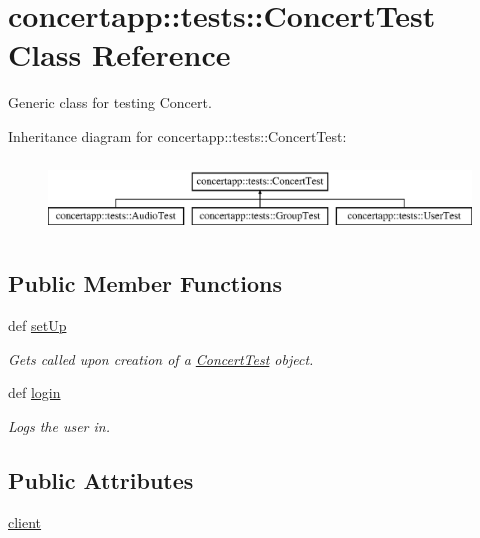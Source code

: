 \hypertarget{classconcertapp_1_1tests_1_1_concert_test}{
\section{concertapp::tests::ConcertTest Class Reference}
\label{classconcertapp_1_1tests_1_1_concert_test}
}


Generic class for testing Concert.  


Inheritance diagram for concertapp::tests::ConcertTest:\begin{figure}[H]
\begin{center}
\leavevmode
\includegraphics[height=1.975309cm]{classconcertapp_1_1tests_1_1_concert_test}
\end{center}
\end{figure}
\subsection*{Public Member Functions}
\begin{DoxyCompactItemize}
\item 
def \hyperlink{classconcertapp_1_1tests_1_1_concert_test_ab670c5bba4a3963036682d228f142406}{setUp}
\begin{DoxyCompactList}\small\item\em Gets called upon creation of a \hyperlink{classconcertapp_1_1tests_1_1_concert_test}{ConcertTest} object. \item\end{DoxyCompactList}\item 
def \hyperlink{classconcertapp_1_1tests_1_1_concert_test_a089e883fda6f7bd52b05b2ec3c1d691e}{login}
\begin{DoxyCompactList}\small\item\em Logs the user in. \item\end{DoxyCompactList}\end{DoxyCompactItemize}
\subsection*{Public Attributes}
\begin{DoxyCompactItemize}
\item 
\hyperlink{classconcertapp_1_1tests_1_1_concert_test_a7b7359c53beed37ac59a765bde668852}{client}
\end{DoxyCompactItemize}


